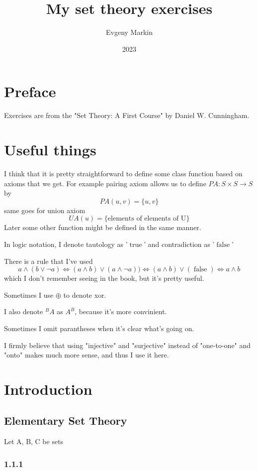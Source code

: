 \documentclass[11pt,oneside,titlepage]{book}
\title{My set theory exercises}
\author{Evgeny Markin}
\date{2023}
\DeclareMathOperator \lra {\Leftrightarrow}
\DeclareMathOperator \true {true}
\DeclareMathOperator \false {false}
\begin{document}
\maketitle
\tableofcontents

\chapter*{Preface}

Exercises are from the "Set Theory: A First Course" by Daniel W. Cunningham.

\chapter*{Useful things}

I think that it is pretty straightforward to define some class function based on
axioms that we get.
For example pairing axiom allows us to define $PA: S \times S \to S$ by
$$PA(u, v) = \{u, v\}$$
same goes for union axiom
$$UA(u) = \{\text{elements of elements of U}\}$$
Later some other function might be defined in the same manner.

In logic notation, I denote tautology as '$\true$' and contradiction as '$\false$'

There is a rule that I've used
$$a \land (b \lor \neg a) \lra (a \land b) \lor (a \land \neg a))
\lra (a \land b) \lor (\false) \lra a \land b$$
which I don't remember seeing in the book, but it's pretty useful.

Sometimes I use $\oplus$ to denote xor.

I also denote $^BA$ as $A^B$, because it's more convinient.

Sometimes I omit parantheses when it's clear what's going on.

I firmly believe that using "injective" and "surjective" instead of "one-to-one" and
"onto" makes much more sense, and thus I use it here.

\chapter{Introduction}

\section{Elementary Set Theory}

Let A, B, C be sets

\subsection*{1.1.1}
\end{document}

